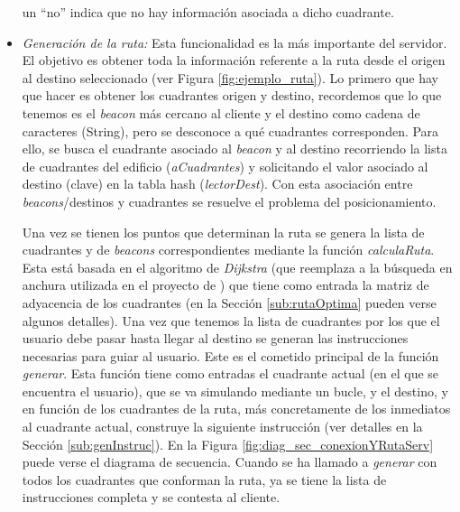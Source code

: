 \begin{itemize}
un ``no'' indica que no hay información asociada a dicho cuadrante. %
	
	  
	\item \textit{Generación de la ruta:} Esta funcionalidad es la más importante del servidor. El objetivo es obtener toda la información referente a la ruta desde el origen al destino seleccionado (ver Figura \ref{fig:ejemplo_ruta}). Lo primero que hay que hacer es obtener los cuadrantes origen y destino, recordemos que lo que tenemos es el \textit{beacon} más cercano al cliente y el destino como cadena de caracteres (String), pero se desconoce a qué cuadrantes corresponden. Para ello, se busca el cuadrante asociado al \textit{beacon} y al destino recorriendo la lista de cuadrantes del edificio (\textit{aCuadrantes}) y solicitando el valor asociado al destino (clave) en la tabla hash (\textit{lectorDest}). Con esta asociación entre \textit{beacons}/destinos y cuadrantes se resuelve el problema del posicionamiento. 
	
	Una vez se tienen los puntos que determinan la ruta se genera la lista de cuadrantes y de \textit{beacons} correspondientes mediante la función \textit{calculaRuta}. Esta está basada en el algoritmo de \textit{Dijkstra} (que reemplaza a la búsqueda en anchura utilizada en el proyecto de \cite{TFGguia}) que tiene como entrada la matriz de adyacencia de los cuadrantes (en la Sección \ref{sub:rutaOptima} pueden verse algunos detalles). Una vez que tenemos la lista de cuadrantes por los que el usuario debe pasar hasta llegar al destino se generan las instrucciones necesarias para guiar al usuario. Este es el cometido principal de la función \textit{generar}. Esta función tiene como entradas el cuadrante actual (en el que se encuentra el usuario), que se va simulando mediante un bucle, y el destino, y en función de los cuadrantes de la ruta, más concretamente de los inmediatos al cuadrante actual, construye la siguiente instrucción (ver detalles en la Sección \ref{sub:genInstruc}). En la Figura \ref{fig:diag_sec_conexionYRutaServ} puede verse el diagrama de secuencia.	Cuando se ha llamado a \textit{generar} con todos los cuadrantes que conforman la ruta, ya se tiene la lista de instrucciones completa y se contesta al cliente. 
\end{itemize}




